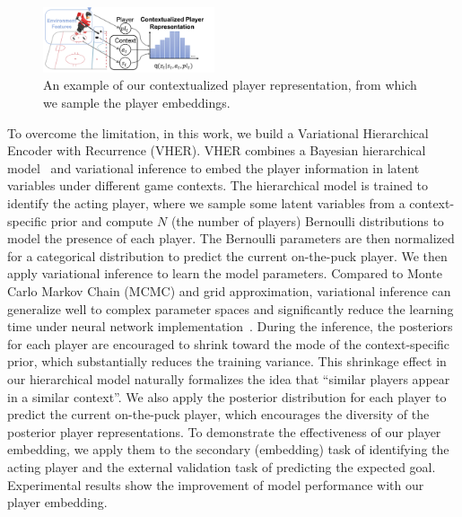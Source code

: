 \documentclass[letterpaper]{article} %
\begin{document}
\begin{figure}[t!]
    \centering
    \includegraphics[width=0.45\textwidth] 
    {./figures/player-embedding-example.png}
    \caption{An example of our contextualized player representation, from which we sample the player embeddings.
    } 
    \label{fig:ice-hockey-rink}
\end{figure}

To overcome the limitation, in this work, we build a Variational Hierarchical Encoder with Recurrence (VHER). VHER combines a Bayesian hierarchical model~\cite{kruschke2014doing} and variational inference to embed the player information in latent variables under different game contexts.
The hierarchical model is trained to identify the acting player, where we sample some latent variables from a context-specific prior and compute $N$ (the number of players) Bernoulli distributions to model the presence of each player. The Bernoulli parameters are then normalized for a categorical distribution to predict the current on-the-puck player. 
We then apply variational inference to learn the model parameters. Compared to Monte Carlo Markov Chain (MCMC) and grid approximation, variational inference can generalize well to complex parameter spaces and significantly reduce the learning time under neural network implementation~\cite{BleiKM16}. During the inference, the posteriors for each player are encouraged to shrink toward the mode of the context-specific prior, which substantially reduces the training variance. 
This shrinkage effect in our hierarchical model naturally
formalizes the idea that “similar players appear in a similar context”. 
We also apply the posterior distribution for each player to predict the current on-the-puck player, which encourages the diversity of the posterior player representations.
To demonstrate the effectiveness of our player embedding, we apply them to the secondary (embedding) task of identifying the acting player and the external validation task of predicting the expected goal. Experimental results show the improvement of model performance with our player embedding.  
\end{document}
